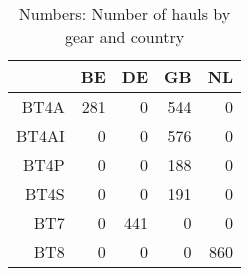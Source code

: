 \begin{table}[ht]
\centering
\begin{tabular}{rrrrr}
  \hline
 & BE & DE & GB & NL \\ 
  \hline
BT4A & 281 & 0 & 544 & 0 \\ 
  BT4AI & 0 & 0 & 576 & 0 \\ 
  BT4P & 0 & 0 & 188 & 0 \\ 
  BT4S & 0 & 0 & 191 & 0 \\ 
  BT7 & 0 & 441 & 0 & 0 \\ 
  BT8 & 0 & 0 & 0 & 860 \\ 
   \hline
\end{tabular}
\caption{Numbers: Number of hauls by gear and country} 
\end{table}
